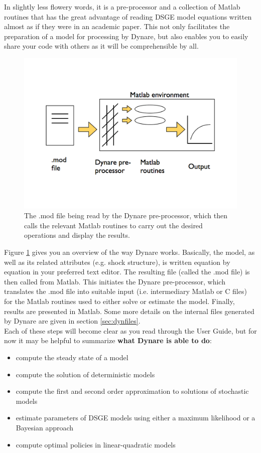 In slightly less flowery words, it is a pre-processor and a collection of Matlab routines that has the great advantage of reading DSGE model equations written almost as if they were in an academic paper. This not only facilitates the preparation of a model for processing by Dynare, but also enables you to easily share your code with others as it will be comprehensible by all.\\
\begin{figure}
\begin{center}
\includegraphics[width=1.0\textwidth]{P_DynareStruct2}
\end{center}
\caption[Dynare, a bird's eyeview]{The .mod file being read by the Dynare pre-processor, which then calls the relevant Matlab routines to carry out the desired operations and display the results.}
\label{fig:dyn}
\end{figure}

Figure \ref{fig:dyn} gives you an overview of the way Dynare works. Basically, the model, as well as its related attributes (e.g. shock structure), is written equation by equation in your preferred text editor. The resulting file (called the .mod file) is then called from Matlab. This initiates the Dynare pre-processor, which translates the .mod file into suitable input (i.e. intermediary Matlab or C files) for the Matlab routines used to either solve or estimate the model.  Finally, results are presented in Matlab. Some more details on the internal files generated by Dynare are given in section \ref{sec:dynfiles}. \\

Each of these steps will become clear as you read through the User Guide, but for now it may be helpful to summarize \textbf{what Dynare is able to do}:
\begin{itemize}
\item compute the steady state of a model
\item compute the solution of deterministic models
\item compute the first and second order approximation to solutions of stochastic models
\item estimate parameters of DSGE models using either a maximum likelihood or a Bayesian approach
\item compute optimal policies in linear-quadratic models
\end{itemize}



